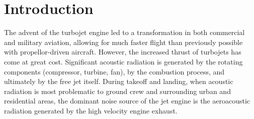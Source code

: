\chapter{Introduction}
\label{introduction}

The advent of the turbojet engine led to a transformation in both commercial and military aviation, allowing for much faster flight than previously possible with propellor-driven aircraft. 
However, the increased thrust of turbojets has come at great cost.
Significant acoustic radiation is generated by the rotating components (compressor, turbine, fan), by the combustion process, and ultimately by the free jet itself. 
During takeoff and landing, when acoustic radiation is most problematic to ground crew and  surrounding urban and residential areas, the dominant noise source of the jet engine is the aeroacoustic radiation generated by the high velocity engine exhaust.


